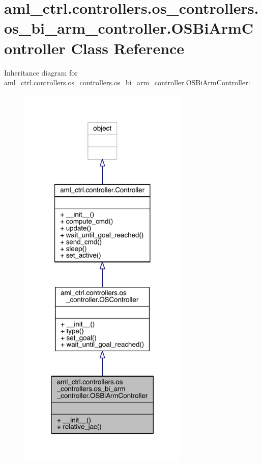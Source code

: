 \hypertarget{classaml__ctrl_1_1controllers_1_1os__controllers_1_1os__bi__arm__controller_1_1_o_s_bi_arm_controller}{}\section{aml\+\_\+ctrl.\+controllers.\+os\+\_\+controllers.\+os\+\_\+bi\+\_\+arm\+\_\+controller.\+O\+S\+Bi\+Arm\+Controller Class Reference}
\label{classaml__ctrl_1_1controllers_1_1os__controllers_1_1os__bi__arm__controller_1_1_o_s_bi_arm_controller}


Inheritance diagram for aml\+\_\+ctrl.\+controllers.\+os\+\_\+controllers.\+os\+\_\+bi\+\_\+arm\+\_\+controller.\+O\+S\+Bi\+Arm\+Controller\+:\nopagebreak
\begin{figure}[H]
\begin{center}
\leavevmode
\includegraphics[width=230pt]{classaml__ctrl_1_1controllers_1_1os__controllers_1_1os__bi__arm__controller_1_1_o_s_bi_arm_controller__inherit__graph}
\end{center}
\end{figure}


